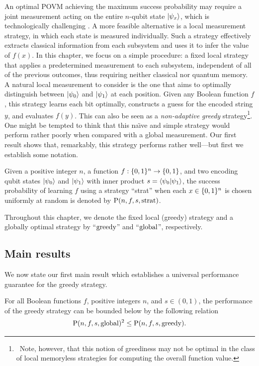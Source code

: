 An optimal POVM achieving the maximum success probability may require a joint measurement acting on the entire $n$-qubit state $\ket{\psi_x}$, which is technologically challenging \cite{lvovsky2009optical,ma2021one,conlon2023approaching}.
A more feasible alternative is a local measurement strategy, in which each state is measured individually.
Such a strategy effectively extracts classical information from each subsystem and uses it to infer the value of $f(x)$.
In this chapter, we focus on a simple procedure: a fixed local strategy that applies a predetermined measurement to each subsystem, independent of all of the previous outcomes, thus requiring neither classical nor quantum memory.
A natural local measurement to consider is the one that aims to optimally distinguish between $\ket{\psi_0}$ and $\ket{\psi_1}$ at each position.
Given any Boolean function $f$, this strategy learns each bit optimally, constructs a guess for the encoded string $y$, and evaluates $f(y)$.
This can also be seen as a \emph{non-adaptive greedy} strategy\footnote{\
    Note, however, that this notion of greediness may not be optimal in the class of local memoryless strategies for computing the overall function value.
}.
One might be tempted to think that this na{\"\i}ve and simple strategy would perform rather poorly when compared with a global measurement.
Our first result shows that, remarkably, this strategy performs rather well---but first we establish some notation.
\begin{definition}
    Given a positive integer $n$, a function $f : \bit^n \to \bit$, and two encoding qubit states $\ket{\psi_0}$ and $\ket{\psi_1}$ with inner product $s = \braket{\psi_0}{\psi_1}$, the success probability of learning $f$ using a strategy ``strat'' when each $x \in \bit^n$ is chosen uniformly at random is denoted by $\P(n,f,s,\mathrm{strat})$.
\end{definition}
Throughout this chapter, we denote the fixed local (greedy) strategy and a globally optimal strategy by ``$\greedy$'' and ``$\glo$'', respectively.


\subsection{Main results}

We now state our first main result which establishes a universal performance guarantee for the greedy strategy.
\begin{theorem}\label{thm:ch5_qseq-PGM}
    For all Boolean functions $f$, positive integers $n$, and $s \in (0,1)$, the performance of the greedy strategy can be bounded below by the following relation
    \begin{equation}
        \P(n,f,s,\glo)^2 \leq \P(n,f,s,\greedy).
    \end{equation}
\end{theorem}

